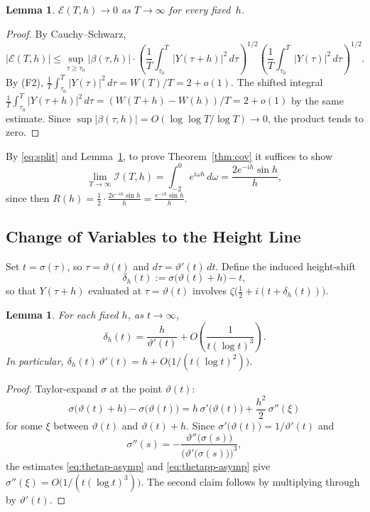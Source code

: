 \documentclass[11pt]{article}
\theoremstyle{plain}
\newtheorem{lemma}[theorem]{Lemma}
\theoremstyle{definition}
\newcommand{\assign}{:=}
\begin{document}
\begin{lemma}\label{lem:error-vanishes}
$\mathcal{E}(T,h)\to 0$ as $T\to\infty$ for every fixed~$h$.
\end{lemma}

\begin{proof}
By Cauchy--Schwarz,
\[
|\mathcal{E}(T,h)|
\le
\sup_{\tau\ge\tau_0}|\beta(\tau,h)|
\cdot
\left(\frac{1}{T}\int_{\tau_0}^T |Y(\tau+h)|^2\,d\tau\right)^{1/2}
\left(\frac{1}{T}\int_{\tau_0}^T |Y(\tau)|^2\,d\tau\right)^{1/2}.
\]
By (F2), $\frac{1}{T}\int_{\tau_0}^T|Y(\tau)|^2\,d\tau = W(T)/T = 2+o(1)$.
The shifted integral $\frac{1}{T}\int_{\tau_0}^T|Y(\tau+h)|^2\,d\tau
= (W(T+h)-W(h))/T = 2+o(1)$ by the same estimate.
Since $\sup|\beta(\tau,h)| = O(\log\log T/\log T)\to 0$,
the product tends to zero.
\end{proof}

By \eqref{eq:split} and Lemma~\ref{lem:error-vanishes},
to prove Theorem~\ref{thm:cov} it suffices to show
\begin{equation}\label{eq:suffices}
\lim_{T\to\infty}\mathcal{I}(T,h)
= \int_{-2}^{0} e^{i\omega h}\,d\omega
= \frac{2e^{-ih}\sin h}{h},
\end{equation}
since then
$R(h) = \frac{1}{2}\cdot\frac{2e^{-ih}\sin h}{h}
= \frac{e^{-ih}\sin h}{h}$.

\subsection*{Change of Variables to the Height Line}

Set $t=\sigma(\tau)$, so $\tau=\vartheta(t)$ and
$d\tau = \vartheta'(t)\,dt$.
Define the induced height-shift
\begin{equation}\label{eq:delta-def}
\delta_h(t) \assign \sigma\bigl(\vartheta(t)+h\bigr) - t,
\end{equation}
so that $Y(\tau+h)$ evaluated at $\tau=\vartheta(t)$ involves
$\zeta\bigl(\tfrac{1}{2}+i(t+\delta_h(t))\bigr)$.

\begin{lemma}\label{lem:delta}
For each fixed $h$, as $t\to\infty$,
\[
\delta_h(t)
= \frac{h}{\vartheta'(t)}
  + O\!\left(\frac{1}{t(\log t)^3}\right).
\]
In particular,
$\delta_h(t)\,\vartheta'(t) = h + O\bigl(1/(t(\log t)^2)\bigr)$.
\end{lemma}

\begin{proof}
Taylor-expand $\sigma$ at the point $\vartheta(t)$:
\[
\sigma\bigl(\vartheta(t)+h\bigr) - \sigma\bigl(\vartheta(t)\bigr)
= h\,\sigma'\bigl(\vartheta(t)\bigr)
  + \frac{h^2}{2}\,\sigma''(\xi)
\]
for some $\xi$ between $\vartheta(t)$ and $\vartheta(t)+h$.
Since $\sigma'\bigl(\vartheta(t)\bigr) = 1/\vartheta'(t)$
and
\[
\sigma''(s)
= -\frac{\vartheta''\bigl(\sigma(s)\bigr)}
        {\bigl(\vartheta'\bigl(\sigma(s)\bigr)\bigr)^3},
\]
the estimates \eqref{eq:thetap-asymp} and \eqref{eq:thetapp-asymp} give
$\sigma''(\xi) = O\bigl(1/(t(\log t)^3)\bigr)$.
The second claim follows by multiplying through by $\vartheta'(t)$.
\end{proof}
\end{document}
